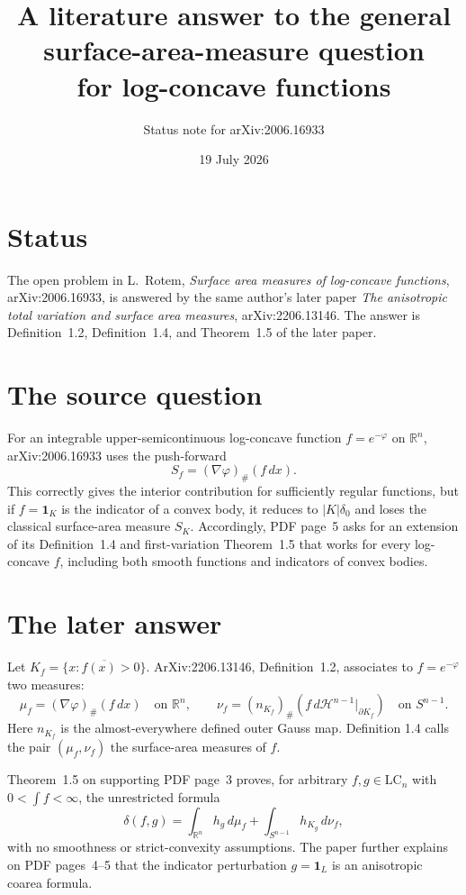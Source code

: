 \documentclass[11pt]{article}
\title{A literature answer to the general surface-area-measure question\\
for log-concave functions}
\author{Status note for arXiv:2006.16933}
\date{19 July 2026}
\begin{document}
\maketitle

\section*{Status}

The open problem in L.~Rotem, \emph{Surface area measures of log-concave
functions}, arXiv:2006.16933, is answered by the same author's later paper
\emph{The anisotropic total variation and surface area measures},
arXiv:2206.13146.  The answer is Definition~1.2, Definition~1.4, and
Theorem~1.5 of the later paper.

\section*{The source question}

For an integrable upper-semicontinuous log-concave function
$f=e^{-\varphi}$ on $\mathbb R^n$, arXiv:2006.16933 uses the push-forward
\[
  S_f=(\nabla\varphi)_{\#}(f\,dx).
\]
This correctly gives the interior contribution for sufficiently regular
functions, but if $f=\mathbf 1_K$ is the indicator of a convex body, it reduces
to $|K|\delta_0$ and loses the classical surface-area measure $S_K$.
Accordingly, PDF page~5 asks for an extension of its Definition~1.4 and
first-variation Theorem~1.5 that works for every log-concave $f$, including
both smooth functions and indicators of convex bodies.

\section*{The later answer}

Let $K_f=\overline{\{x:f(x)>0\}}$.  ArXiv:2206.13146, Definition~1.2,
associates to $f=e^{-\varphi}$ two measures:
\[
  \mu_f=(\nabla\varphi)_{\#}(f\,dx)
  \quad\text{on }\mathbb R^n,
  \qquad
  \nu_f=(n_{K_f})_{\#}
  \left(f\,d\mathcal H^{n-1}\big|_{\partial K_f}\right)
  \quad\text{on }S^{n-1}.
\]
Here $n_{K_f}$ is the almost-everywhere defined outer Gauss map.  Definition
1.4 calls the pair $(\mu_f,\nu_f)$ the surface-area measures of $f$.

Theorem~1.5 on supporting PDF page~3 proves, for arbitrary
$f,g\in\mathrm{LC}_n$ with $0<\int f<\infty$, the unrestricted formula
\[
  \delta(f,g)
  =\int_{\mathbb R^n}h_g\,d\mu_f
   +\int_{S^{n-1}}h_{K_g}\,d\nu_f,
\]
with no smoothness or strict-convexity assumptions.  The paper further
explains on PDF pages~4--5 that the indicator perturbation $g=\mathbf 1_L$
is an anisotropic coarea formula.
\end{document}

